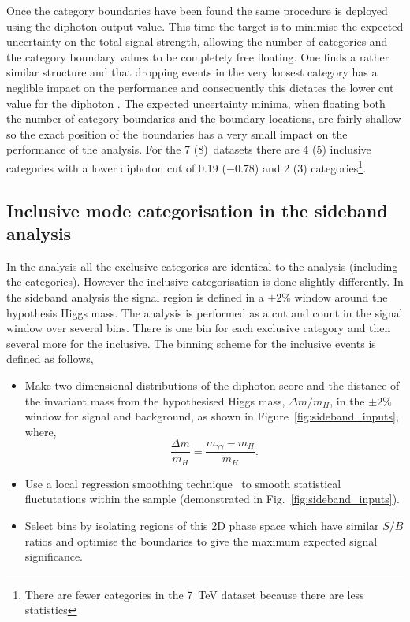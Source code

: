 Once the \VBF category boundaries have been found the same procedure is deployed using the diphoton \BDT output value. This time the target is to minimise the expected uncertainty on the total signal strength, allowing the number of categories and the category boundary values to be completely free floating. One finds a rather similar structure and that dropping events in the very loosest category has a neglible impact on the performance and consequently this dictates the lower cut value for the diphoton \BDT. The expected uncertainty minima, when floating both the number of category boundaries and the boundary locations, are fairly shallow so the exact position of the boundaries has a very small impact on the performance of the analysis. For the 7 (8)~\TeV datasets there are 4 (5) inclusive categories with a lower diphoton \BDT cut of 0.19 ($-0.78$) and 2 (3) \VBF categories\footnote{There are fewer categories in the 7~TeV dataset because there are less statistics}.

\subsection{Inclusive mode categorisation in the sideband \MVA analysis}
\label{sec:inclusive_cats_sideband}

In the \SMVA analysis all the exclusive categories are identical to the \MFM analysis (including the \VBF categories). However the inclusive categorisation is done slightly differently. In the sideband analysis the signal region is defined in a $\pm2$\% window around the hypothesis Higgs mass. The analysis is performed as a cut and count in the signal window over several bins. There is one bin for each exclusive category and then several more for the inclusive. The binning scheme for the inclusive events is defined as follows,

\begin{itemize}
  \item Make two dimensional distributions of the diphoton \BDT score and the distance of the invariant mass from the hypothesised Higgs mass, $\Delta m/m_{H}$, in the $\pm2$\% window for signal and background, as shown in Figure~\ref{fig:sideband_inputs}, where,
    \begin{equation}
      \frac{\Delta m}{m_{H}} = \frac{m_{\gamma\gamma} - m_{H}}{m_{H}}.
    \end{equation}
  \item Use a local regression smoothing technique~\cite{regression_smoothing} to smooth statistical fluctutations within the sample (demonstrated in Fig.~\ref{fig:sideband_inputs}).
  \item Select bins by isolating regions of this 2D phase space which have similar $S/B$ ratios and optimise the boundaries to give the maximum expected signal significance.   
\end{itemize}

